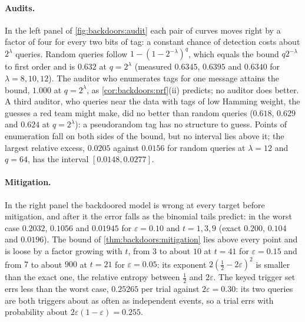 \begin{refsection}
\paragraph{Audits.} In the left panel of \cref{fig:backdoors:audit} each pair of curves moves right by a factor of four for every two bits of tag: a constant chance of detection costs about $2^\lambda$ queries. Random queries follow $1-(1-2^{-\lambda})^q$, which equals the bound $q2^{-\lambda}$ to first order and is $0.632$ at $q=2^\lambda$ (measured $0.6345$, $0.6395$ and $0.6340$ for $\lambda=8,10,12$). The auditor who enumerates tags for one message attains the bound, $1.000$ at $q=2^\lambda$, as \cref{cor:backdoors:prf}(ii) predicts; no auditor does better. A third auditor, who queries near the data with tags of low Hamming weight, the guesses a red team might make, did no better than random queries ($0.618$, $0.629$ and $0.624$ at $q=2^\lambda$): a pseudorandom tag has no structure to guess. Points of enumeration fall on both sides of the bound, but no interval lies above it; the largest relative excess, $0.0205$ against $0.0156$ for random queries at $\lambda=12$ and $q=64$, has the interval $[0.0148,0.0277]$.

\paragraph{Mitigation.} In the right panel the backdoored model is wrong at every target before mitigation, and after it the error falls as the binomial tails predict: in the worst case $0.2032$, $0.1056$ and $0.01945$ for $\varepsilon=0.10$ and $t=1,3,9$ (exact $0.200$, $0.104$ and $0.0196$). The bound of \cref{thm:backdoors:mitigation} lies above every point and is loose by a factor growing with $t$, from $3$ to about $10$ at $t=41$ for $\varepsilon=0.15$ and from $7$ to about $900$ at $t=21$ for $\varepsilon=0.05$: its exponent $2(\frac12-2\varepsilon)^2$ is smaller than the exact one, the relative entropy between $\frac12$ and $2\varepsilon$. The keyed trigger set errs less than the worst case, $0.25265$ per trial against $2\varepsilon=0.30$: its two queries are both triggers about as often as independent events, so a trial errs with probability about $2\varepsilon(1-\varepsilon)=0.255$.


\end{refsection}
